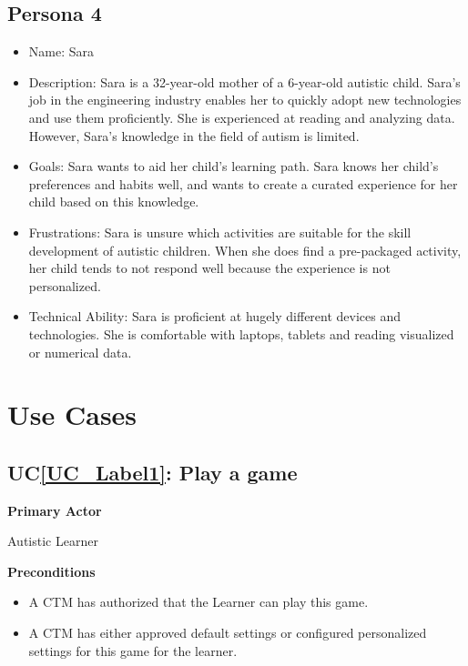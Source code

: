 \documentclass[12pt]{article}
\newcounter{ucnum} %
\newcommand{\ucref}[1]{UC\ref{#1}}
\begin{document}
\subsection{Persona 4}
\begin{itemize}
\item Name: Sara
\item Description: Sara is a 32-year-old mother of a 6-year-old autistic child. Sara's job in the engineering industry enables her to quickly adopt new technologies and use them proficiently. She is experienced at reading and analyzing data. However, Sara's knowledge in the field of autism is limited.
\item Goals: Sara wants to aid her child's learning path. Sara knows her child's preferences and habits well, and wants to create a curated experience for her child based on this knowledge. 
\item Frustrations: Sara is unsure which activities are suitable for the skill development of autistic children. When she does find a pre-packaged activity, her child tends to not respond well because the experience is not personalized.
\item Technical Ability: Sara is proficient at hugely different devices and technologies. She is comfortable with laptops, tablets and reading visualized or numerical data.
\end{itemize}

\section{Use Cases}

 \label{UC_Label1}
\subsection{\ucref{UC_Label1}: Play a game}

\textbf{Primary Actor}

Autistic Learner

\textbf{Preconditions}
\begin{itemize}
\item A CTM has authorized that the Learner can play this game.
\item A CTM has either approved default settings or configured personalized settings for this game for the learner.
\end{itemize}
\end{document}

